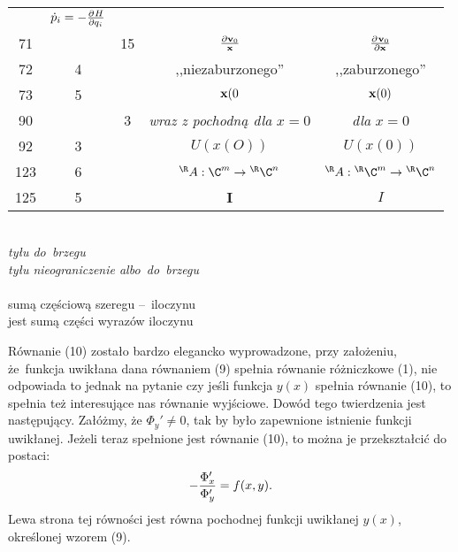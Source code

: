 \documentclass[a4paper,11pt]{article}
\begin{document}
\begin{center}
\begin{tabular}{|c|c|c|c|c|}
           & $\dot{ p }_{ i } = -\frac{ \partial^{   } {  H  } }{ \partial {  q_{ i }  }^{   } }$ \\
    71  & & 15 & $\frac{ \partial \mathbf{v}_{ 0 } }{ \mathbf{x} }$
           & $\frac{ \partial^{  } {  \mathbf{v}_{ 0 }  } }{ \partial {  \mathbf{x}}^{  } }$ \\
    72  &  4 & & ,,niezaburzonego'' & ,,zaburzonego'' \\
    73  &  5 & & $\mathbf{x}( 0$ & $\mathbf{x}( 0 )$ \\
    90  & &  3 & \emph{wraz z pochodną dla} $x = 0$ & \emph{dla} $x = 0$ \\
    92  &  3 & & $U( x( O ) )$ & $U( x( 0 ) )$ \\
    123 &  6 & & $^{ \R }A : \C^{ m } \to { }^{ \R }\C^{ n }$
           & ${ }^{ \R }A : { }^{ \R }\C^{ m } \to { }^{ \R }\C^{ n }$ \\
    125 &  5 & & $\mathbf{I}$ & $I$ \\
    \hline
  \end{tabular}
\end{center}
\noi
{} \\
\Jest \emph{tyłu do~brzegu} \\
\Pow  \emph{tyłu nieograniczenie albo~do~brzegu} \\
 \\
\Jest sumą częściową szeregu --~iloczynu \\
\Pow  jest sumą części wyrazów iloczynu \\








\start {} Równanie (10) zostało bardzo elegancko wyprowadzone,
przy założeniu, że~funkcja uwikłana dana równaniem (9) spełnia
równanie różniczkowe (1), nie odpowiada to jednak na pytanie czy jeśli
funkcja $y( x )$ spełnia równanie (10), to spełnia też interesujące
nas równanie wyjściowe. Dowód tego twierdzenia jest następujący.
Załóżmy, że $\Phi_{ y }' \neq 0$, tak by było zapewnione istnienie
funkcji uwikłanej. Jeżeli teraz spełnione jest równanie (10), to można
je przekształcić do postaci:
\begin{equation}
  -\frac{ \Phi_{ x }' }{ \Phi_{ y }' } = f( x, y ).
\end{equation}
Lewa strona tej równości jest równa pochodnej funkcji uwikłanej
$y( x )$, określonej wzorem (9). \\
\start {} \Dok \\
\start {} \Dok
\end{document}
